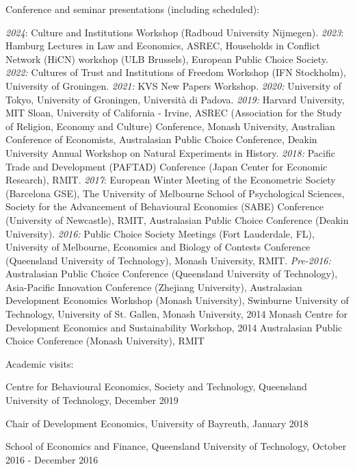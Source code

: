 \documentclass[letterpaper]{article}
\renewenvironment{itemize}{
  \begin{list}{}{
    \setlength{\leftmargin}{1.5em}
  }
}{
  \end{list}
}
\begin{document}
\begin{itemize}
	\item Conference and seminar presentations (including scheduled):
	\begin{itemize}
		\item \textit{2024}: Culture and Institutions Workshop (Radboud University Nijmegen). \textit{2023}: Hamburg Lectures in Law and Economics, ASREC, Households in Conflict Network (HiCN) workshop (ULB Brussels), European Public Choice Society. \textit{2022:}  Cultures of Trust and Institutions of Freedom Workshop (IFN Stockholm), University of Groningen. \textit{2021:} KVS New Papers Workshop. \textit{2020:} University of Tokyo, University of Groningen, Università di Padova. \textit{2019:} Harvard University, MIT Sloan, University of California - Irvine, ASREC (Association for the Study of Religion, Economy and Culture) Conference, Monash University, Australian Conference of Economists, Australasian Public Choice Conference, Deakin University Annual Workshop on Natural Experiments in History.  \textit{2018:} Pacific Trade and Development (PAFTAD) Conference (Japan Center for Economic Research), RMIT. \textit{2017}: European Winter Meeting of the Econometric Society (Barcelona GSE), The University of Melbourne School of Psychological Sciences, Society for the Advancement of Behavioural Economics (SABE) Conference (University of Newcastle), RMIT, Australasian Public Choice Conference (Deakin University). \textit{2016:} Public Choice Society Meetings (Fort Lauderdale, FL), University of Melbourne, Economics and Biology of Contests Conference (Queensland University of Technology), Monash University, RMIT. \textit{Pre-2016: }Australasian Public Choice Conference (Queensland University of Technology), Asia-Pacific Innovation Conference (Zhejiang University), Australasian Development Economics Workshop (Monash University), Swinburne University of Technology, University of St. Gallen, Monash University, 2014 Monash Centre for Development Economics and Sustainability Workshop, 2014 Australasian Public Choice Conference (Monash University), RMIT
	\end{itemize}
	
	\item Academic visits:
	
	\begin{itemize}
				\item Centre for Behavioural Economics, Society and Technology, Queensland University of Technology, December 2019
		\item Chair of Development Economics, University of Bayreuth, January 2018
		\item School of Economics and Finance, Queensland University of Technology, October 2016 - December 2016
	\end{itemize}
	

\end{itemize}
\end{document}
